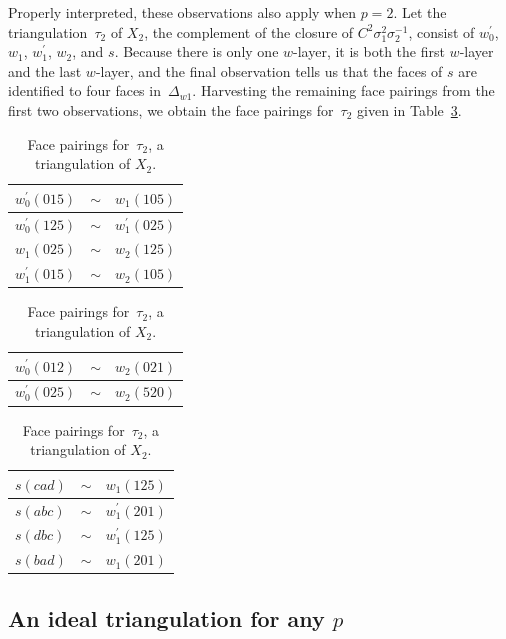 \documentclass[reqno]{amsart}
\theoremstyle{plain}
\theoremstyle{definition}
\begin{document}
Properly interpreted, these observations also apply when $p=2$.  Let the triangulation~$\tau_{2}$ of $X_{2}$, the complement of the closure of $C^2\sigma_1^2\sigma_2^{-1}$, consist of $w_0^\prime$, $w_1$, $w_1^\prime$, $w_2$, and $s$.  Because there is only one $w$-layer, it is both the first $w$-layer and the last $w$-layer, and the final observation tells us that the faces of $s$ are identified to four faces in~$\Delta_{w1}$.  Harvesting the remaining face pairings from the first two observations, we obtain the face pairings for~$\tau_{2}$ given in Table~\ref{table:p=2}.


\begin{table}[ht]
\caption{Face pairings for~$\tau_{2}$, a triangulation of $X_{2}$.\label{table:p=2}}
\begin{tabular}{ |l c l|  }
   \hline
$w_0^\prime(015)$    &$\sim$	&$w_1(105)$\\
  \hline
$w_0^\prime(125)$    &$\sim$	&$w_1^\prime(025)$\\
  \hline
$w_1(025)$    &$\sim$	&$w_2(125)$\\
  \hline
$w_1^\prime(015)$    &$\sim$	&$w_2(105)$\\
  \hline
 \end{tabular}\quad
\begin{tabular}{ |l c l|  }
 \hline
 $w_0^\prime(012)$    &$\sim$	&$w_2(021)$\\
  \hline
 $w_0^\prime(025)$    &$\sim$	&$w_2(520)$\\
  \hline
 \end{tabular}\quad
\begin{tabular}{ |l c l|  }
 \hline
$s(cad)$    &$\sim$	&$w_1(125)$\\
  \hline
$s(abc)$    &$\sim$	&$w_1^\prime(201)$\\
  \hline
$s(dbc)$    &$\sim$	&$w_1^\prime(125)$\\
 \hline
$s(bad)$    &$\sim$	&$w_1(201)$\\
 \hline
\end{tabular}
\end{table}


\subsection{An ideal triangulation for any $p$} \label{sec:anyp}
\end{document}
